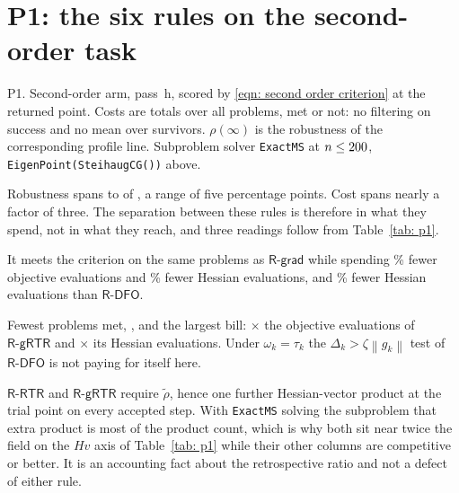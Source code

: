 \documentclass[11pt,a4paper]{article}
\providecommand{\norm}[1]{\left \lVert #1 \right \rVert}
\providecommand{\Rdfo}{\textsf{R-DFO}}
\providecommand{\Rgrad}{\textsf{R-grad}}
\providecommand{\Rrtr}{\textsf{R-RTR}}
\providecommand{\Rgrtr}{\textsf{R-gRTR}}
\theoremstyle{remark}
\begin{document}
\section{P1: the six rules on the second-order task}\label{sec: P1}

\begin{table}[H]
  \centering
  \caption{P1. Second-order arm, pass~h, scored by
    \eqref{eqn: second order criterion} at the returned point. Costs are totals
    over all \NOpened{} problems, met or not: no filtering on success and no mean
    over survivors. $\rho(\infty)$ is the robustness of the corresponding profile
    line. Subproblem solver \texttt{ExactMS} at $n \leq \NMaxExact{}$,
    \texttt{EigenPoint(SteihaugCG())} above.}
  \label{tab: p1}
  
\end{table}

Robustness spans \PoneMetMin{} to \PoneMetMax{} of \NListed{}, a range of five
percentage points. Cost spans nearly a factor of three. The separation between
these rules is therefore in what they spend, not in what they reach, and three
readings follow from Table~\ref{tab: p1}.

\begin{description}[leftmargin=1.8em, style=nextline]
  \item[$\Rgrtr$ is first on both counts.] It meets the criterion on the same
    \PoneRgrtrMet{} problems as $\Rgrad$ while spending \GrtrVsGradF\% fewer
    objective evaluations and \GrtrVsGradHe\% fewer Hessian evaluations, and
    \GrtrVsDfoHe\% fewer Hessian evaluations than $\Rdfo$.
  \item[$\Rdfo$ is last on both counts.] Fewest problems met, \PoneRdfoMet{}, and
    the largest bill: \DfoVsGrtrF$\times$ the objective evaluations of $\Rgrtr$ and
    \DfoVsGrtrHe$\times$ its Hessian evaluations. Under $\omega_k = \tau_k$ the
    $\Delta_k > \zeta\norm{g_k}$ test of $\Rdfo$ is not paying for itself here.
  \item[The two retrospective rules buy their products.] $\Rrtr$ and $\Rgrtr$
    require $\tilde\rho$, hence one further Hessian-vector product at the trial
    point on every accepted step. With \texttt{ExactMS} solving the subproblem
    that extra product is most of the product count, which is why both sit near
    twice the field on the $Hv$ axis of Table~\ref{tab: p1} while their other
    columns are competitive or better. It is an accounting fact about the
    retrospective ratio and not a defect of either rule.
\end{description}
\end{document}
